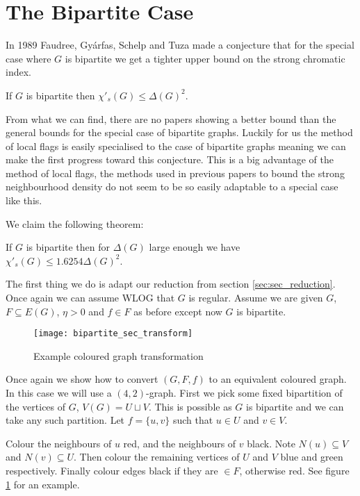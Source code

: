 \section{The Bipartite Case}
\label{sec:sec_bipartite}

In 1989 Faudree, Gyárfas, Schelp and Tuza
made a conjecture that for the special case where $G$ is bipartite we get a tighter
upper bound on the strong chromatic index.

\begin{knownconjecture}
    If $G$ is bipartite then $\chi'_s(G) \leq \Delta(G)^2$.
\end{knownconjecture}

From what we can find, there are no papers showing a better bound than the general
bounds for the special case of bipartite graphs. Luckily for us the method of local flags
is easily specialised to the case of bipartite graphs meaning we can make the first
progress toward this conjecture. This is a big advantage of the method of local flags,
the methods used in previous papers to bound the strong neighbourhood density do not seem
to be so easily adaptable to a special case like this.

We claim the following theorem:
\begin{theorem}
    \label{thm:sec_bipartite_bound}
    If $G$ is bipartite then for $\Delta(G)$ large enough we have
    $\chi'_s(G) \leq 1.6254\Delta(G)^2$.
\end{theorem}

The first thing we do is adapt our reduction from section \ref{sec:sec_reduction}. Once
again we can assume WLOG that $G$ is regular. Assume we are given
$G$, $F \subseteq E(G)$, $\eta > 0$ and $f\in F$ as before except now $G$ is bipartite.

\begin{figure}[ht]
    \centering
    \texttt{[image: bipartite\_sec\_transform]}
    \caption{Example coloured graph transformation}
    \label{fig:bipartite_sec_transform}
\end{figure}

Once again we show how to convert $(G,F,f)$ to an equivalent coloured graph. In this case
we will use a $(4, 2)$-graph. First we pick some fixed bipartition of the vertices
of $G$, $V(G) = U \sqcup V$. This is possible as $G$ is bipartite and we can take any
such partition. Let $f=\{u,v\}$ such that $u\in U$ and $v\in V$.

Colour the neighbours of $u$ red, and the neighbours of $v$ black. Note
$N(u) \subseteq V$ and $N(v)\subseteq U$. Then colour the remaining vertices of
$U$ and $V$ blue and green respectively. Finally colour edges black if they are
$\in F$, otherwise red. See figure \ref{fig:bipartite_sec_transform} for an example.

